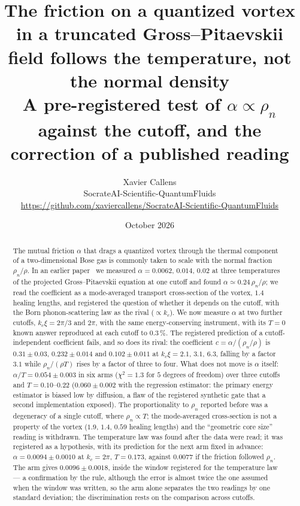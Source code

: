\documentclass[11pt,a4paper]{article}
\title{\textbf{The friction on a quantized vortex in a truncated Gross--Pitaevskii field follows the temperature, not the normal density}\\
\large A pre-registered test of $\alpha\propto\rho_n$ against the cutoff, and the correction of a published reading}
\author{Xavier Callens\\ \small SocrateAI-Scientific-QuantumFluids\\
\small \url{https://github.com/xaviercallens/SocrateAI-Scientific-QuantumFluids}}
\date{October 2026}
\begin{document}
\maketitle

\begin{abstract}\noindent
The mutual friction $\alpha$ that drags a quantized vortex through the thermal component of a two-dimensional Bose
gas is commonly taken to scale with the normal fraction $\rho_n/\rho$. In an earlier paper~\cite{Callens2026a} we measured
$\alpha=0.0062$, $0.014$, $0.02$ at three temperatures of the projected Gross--Pitaevskii equation at one cutoff and
found $\alpha\simeq0.24\,\rho_n/\rho$; we read the coefficient as a mode-averaged transport cross-section of the
vortex, $1.4$ healing lengths, and registered the question of whether it depends on the cutoff, with the Born
phonon-scattering law as the rival ($\propto k_c$). We now measure $\alpha$ at two further cutoffs, $k_c\xi=2\pi/3$ and $2\pi$,
with the same energy-conserving instrument, with its $T=0$ known answer reproduced at each cutoff to $0.3\,\%$. The registered
prediction of a cutoff-independent coefficient fails, and so does its rival: the coefficient $c=\alpha/(\rho_n/\rho)$ is
$0.31\pm0.03$, $0.232\pm0.014$ and $0.102\pm0.011$ at $k_c\xi=2.1$, $3.1$, $6.3$, falling by a factor $3.1$ while $\rho_n/(\rho T)$
rises by a factor of three to four. What does not move is $\alpha$ itself: $\alpha/T=0.054\pm0.003$ in six arms ($\chi^2=1.3$ for $5$ degrees of freedom)
over three cutoffs and $T=0.10$--$0.22$ ($0.060\pm0.002$ with the regression estimator: the primary energy estimator is biased low by diffusion, a flaw of the registered synthetic gate that a second implementation exposed). The proportionality to $\rho_n$ reported before was a degeneracy of a single cutoff, where
$\rho_n\propto T$; the mode-averaged cross-section is not a property of the vortex ($1.9$, $1.4$, $0.59$ healing lengths) and the
``geometric core size'' reading is withdrawn. The temperature law was found after the data were read; it was registered as a hypothesis,
with its prediction for the next arm fixed in advance: $\alpha=0.0094\pm0.0010$ at $k_c=2\pi$, $T=0.173$, against $0.0077$ if the friction followed $\rho_n$. The arm gives $0.0096\pm0.0018$, inside the window registered for the temperature law --- a confirmation by the rule, although the error is almost twice the one assumed when the window was written, so the arm alone separates the two readings by one standard deviation; the discrimination rests on the comparison across cutoffs.
\end{abstract}
\end{document}
